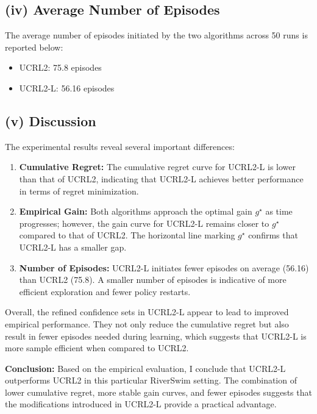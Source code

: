 \subsection*{(iv) Average Number of Episodes}
The average number of episodes initiated by the two algorithms across 50 runs is reported below:
\begin{itemize}
  \item UCRL2: 75.8 episodes
  \item UCRL2-L: 56.16 episodes
\end{itemize}

\subsection*{(v) Discussion}
The experimental results reveal several important differences:

\begin{enumerate}
  \item \textbf{Cumulative Regret:} The cumulative regret curve for UCRL2-L is lower than that of UCRL2, indicating that UCRL2-L achieves better performance in terms of regret minimization.
  \item \textbf{Empirical Gain:} Both algorithms approach the optimal gain \( g^{\star} \) as time progresses; however, the gain curve for UCRL2-L remains closer to \( g^{\star} \) compared to that of UCRL2. The horizontal line marking \( g^{\star} \) confirms that UCRL2-L has a smaller gap.
  \item \textbf{Number of Episodes:} UCRL2-L initiates fewer episodes on average (56.16) than UCRL2 (75.8). A smaller number of episodes is indicative of more efficient exploration and fewer policy restarts.
\end{enumerate}

Overall, the refined confidence sets in UCRL2-L appear to lead to improved empirical performance. They not only reduce the cumulative regret but also result in fewer episodes needed during learning, which suggests that UCRL2-L is more sample efficient when compared to UCRL2.

\bigskip

\noindent\textbf{Conclusion:} Based on the empirical evaluation, I conclude that UCRL2-L outperforms UCRL2 in this particular RiverSwim setting. The combination of lower cumulative regret, more stable gain curves, and fewer episodes suggests that the modifications introduced in UCRL2-L provide a practical advantage.
